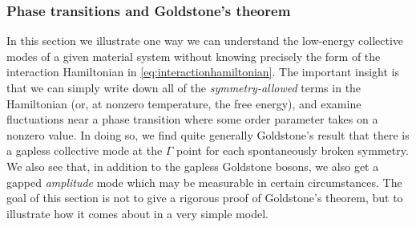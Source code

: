\subsubsection{Phase transitions and Goldstone's theorem}

In this section we illustrate one way we can understand the low-energy collective modes of a given material system without knowing precisely the form of the interaction Hamiltonian in \cref{eq:interactionhamiltonian}.
The important insight is that we can simply write down all of the \emph{symmetry-allowed} terms in the Hamiltonian (or, at nonzero temperature, the free energy), and examine fluctuations near a phase transition where some order parameter takes on a nonzero value.
In doing so, we find quite generally Goldstone's result that there is a gapless collective mode at the $\Gamma$ point for each spontaneously broken symmetry.
We also see that, in addition to the gapless Goldstone bosons, we also get a gapped \emph{amplitude} mode which may be measurable in certain circumstances.
The goal of this section is not to give a rigorous proof of Goldstone's theorem, but to illustrate how it comes about in a very simple model.

